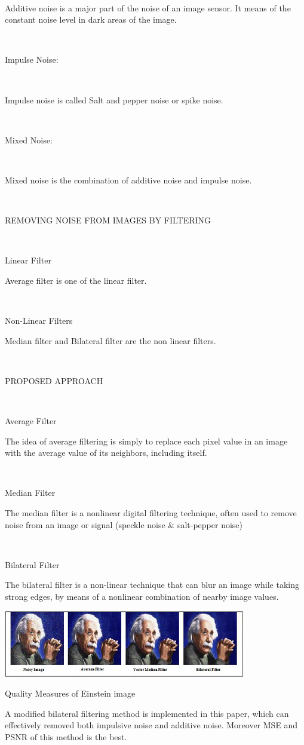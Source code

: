 \

Additive noise is a major part of the noise of an image sensor. It means of the constant noise level in dark areas of the image.

\

Impulse Noise:

\

Impulse noise is called Salt and pepper noise or spike noise. 

\

Mixed Noise:

\

Mixed noise is the combination of additive noise and impulse noise.

\

REMOVING NOISE FROM IMAGES BY FILTERING

\

Linear Filter

Average filter is one of the linear filter.

\

Non-Linear Filters

Median filter and Bilateral filter are the non linear filters.

\

PROPOSED APPROACH

\

Average Filter

The idea of average filtering is simply to replace each pixel value in an image with the average value of its neighbors, including itself.

\  

Median Filter

The median filter is a nonlinear digital filtering technique, often
used to remove noise from an image or signal (speckle noise \&
salt-pepper noise)

\ 

Bilateral Filter

The bilateral filter is a non-linear technique that can blur an image while taking strong edges, by means of a nonlinear combination of nearby image values.

\vspace{0.1cm}

\begin{center}
\includegraphics{10.png}

 Quality Measures of Einstein image
\end{center}

 A modified bilateral filtering method is implemented in this paper, which can effectively removed both impulsive noise and additive noise. Moreover MSE and PSNR of this method is the best.
